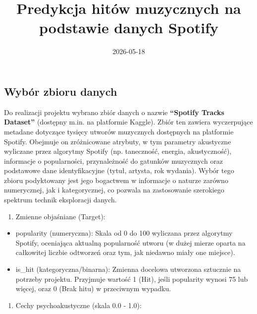 \documentclass[
]{article}
\title{Predykcja hitów muzycznych na podstawie danych Spotify}
\author{}
\date{\vspace{-2.5em}2026-05-18}
\providecommand{\tightlist}{%
  \setlength{\itemsep}{0pt}\setlength{\parskip}{0pt}}
\begin{document}
\maketitle

\subsection{Wybór zbioru danych}\label{wybuxf3r-zbioru-danych}

Do realizacji projektu wybrano zbiór danych o nazwie \textbf{``Spotify
Tracks Dataset''} (dostępny m.in. na platformie Kaggle). Zbiór ten
zawiera wyczerpujące metadane dotyczące tysięcy utworów muzycznych
dostępnych na platformie Spotify. Obejmuje on zróżnicowane atrybuty, w
tym parametry akustyczne wyliczane przez algorytmy Spotify (np.
taneczność, energia, akustyczność), informacje o popularności,
przynależność do gatunków muzycznych oraz podstawowe dane
identyfikacyjne (tytuł, artysta, rok wydania). Wybór tego zbioru
podyktowany jest jego bogactwem w informacje o naturze zarówno
numerycznej, jak i kategorycznej, co pozwala na zastosowanie szerokiego
spektrum technik eksploracji danych.

\begin{enumerate}
\def\labelenumi{\arabic{enumi}.}
\tightlist
\item
  Zmienne objaśniane (Target):
\end{enumerate}

\begin{itemize}
\item
  popularity (numeryczna): Skala od 0 do 100 wyliczana przez algorytmy
  Spotify, oceniająca aktualną popularność utworu (w dużej mierze oparta
  na całkowitej liczbie odtworzeń oraz tym, jak niedawno miały one
  miejsce).
\item
  is\_hit (kategoryczna/binarna): Zmienna docelowa utworzona sztucznie
  na potrzeby projektu. Przyjmuje wartość 1 (Hit), jeśli popularity
  wynosi 75 lub więcej, oraz 0 (Brak hitu) w przeciwnym wypadku.
\end{itemize}

\begin{enumerate}
\def\labelenumi{\arabic{enumi}.}
\setcounter{enumi}{1}
\tightlist
\item
  Cechy psychoakustyczne (skala 0.0 - 1.0):
\end{enumerate}
\end{document}
